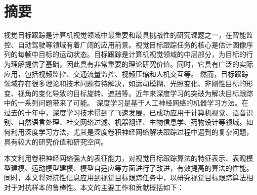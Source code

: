 \maketitle%
\MAKETITLE%
\makedeclaration%
\intobmk\chapter*{摘\quad 要}%
\setcounter{page}{1}%

视觉目标跟踪是计算机视觉领域中最重要和最具挑战性的研究课题之一，在智能监控、自动驾驶等领域有着广阔的应用前景。视觉目标跟踪任务的核心是估计图像序列的每帧中目标的运动状态。目标跟踪是计算机视觉领域的中层部分，为目标的行为理解提供了基础，因此具有非常重要的理论研究价值。同时，它具有广泛的实际应用，包括视频监控、交通流量监控、视频压缩和人机交互等。
然而，目标跟踪领域存在很多理论和技术问题有待解决，如运动模糊、光照变化、非刚性目标的形变、视角的变化导致的目标旋转、遮挡等。近年来深度学习的突破为解决目标跟踪中的一系列问题带来了可能。
深度学习是基于人工神经网络的机器学习方法。在过去的十年中，深度学习技术得到了飞速发展，已成功应用于计算机视觉、语音识别、自然语言处理、社交网络过滤、机器翻译、生物信息学、药物设计等领域。如何利用深度学习方法，尤其是深度卷积神经网络解决跟踪过程中遇到的复杂问题，具有较大的研究价值和研究空间。

本文利用卷积神经网络强大的表征能力，对视觉目标跟踪算法的特征表示、表观模型建模、运动模型建模、模型自适应等方面进行了改进，有效提高的算法的性能。同时，本文将对抗性信息应用到视觉目标跟踪任务中，以研究视觉目标跟踪算法相对于对抗样本的鲁棒性。本文的主要工作和贡献概括如下：

